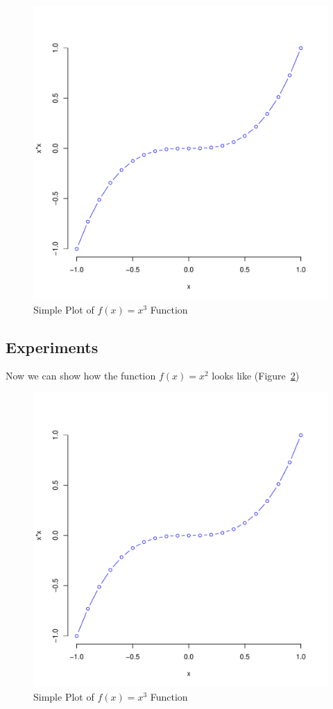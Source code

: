 \documentclass[10pt]{article}\usepackage[]{graphicx}\usepackage[]{color}
\newenvironment{knitrout}{}{} %
\begin{document}
\begin{figure}[H] %
\begin{center}

\begin{knitrout}
\color{fgcolor}
\includegraphics[width=.47\linewidth]{figure/unnamed-chunk-3-1} 

\end{knitrout}

\caption {Simple Plot of $f(x)=x^3$ Function}
\label{fig1}
\end {center}
\end {figure}




\subsection{Experiments}\label{experiments}

Now we can show how the function $f(x)=x^2$ looks like (Figure~\ref{fig2})

\begin{figure}[H] %
\begin{center}

\begin{knitrout}
\color{fgcolor}
\includegraphics[width=.47\linewidth]{figure/unnamed-chunk-4-1} 

\end{knitrout}

\caption {Simple Plot of $f(x)=x^3$ Function}
\label{fig2}
\end {center}
\end {figure}
\end{document}

